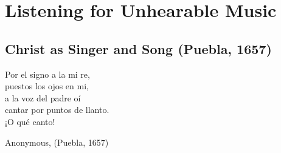 
% 
% 


\part{Listening for Unhearable Music}
\label{part:unhearable-music}

\chapter{Christ as Singer and Song (Puebla, 1657)}
\label{ch:padilla-voces}

\epigraph
{Por el signo a la mi re, \\ 
puestos los ojos en mi, \\
a la voz del padre oí \\
cantar por puntos de llanto. \\
¡O qué canto!}
{Anonymous,  (Puebla, 1657)}

